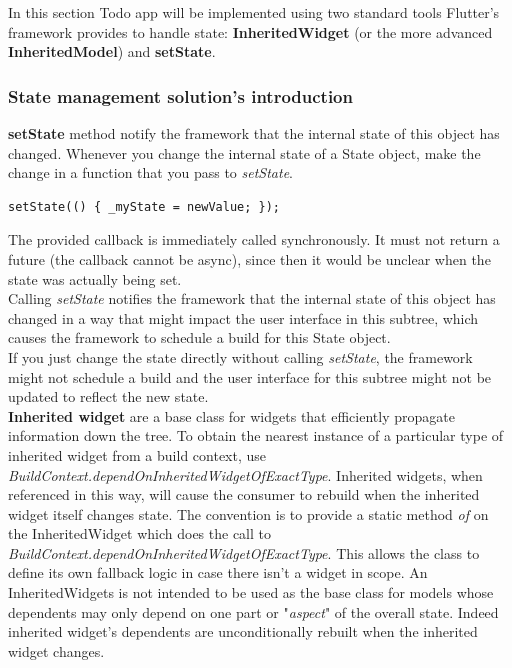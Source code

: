 In this section Todo app will be implemented using two standard tools Flutter’s framework provides to handle state: \textbf{InheritedWidget} (or the more advanced \textbf{InheritedModel}) and \textbf{setState}.
\subsubsection{State management solution’s introduction}  \label{par:todo_app_inherited_widget_introduction}
\textbf{setState} method notify the framework that the internal state of this object has changed.
Whenever you change the internal state of a State object, make the change in a function that you pass to \textit{setState}.\\

\begin{code}
\begin{verbatim}
setState(() { _myState = newValue; });

\end{verbatim}
\end{code}
\mbox{}
The provided callback is immediately called synchronously. It must not return a future (the callback cannot be async), since then it would be unclear when the state was actually being set.\\
Calling \textit{setState} notifies the framework that the internal state of this object has changed in a way that might impact the user interface in this subtree, which causes the framework to schedule a build for this State object.\\
If you just change the state directly without calling \textit{setState}, the framework might not schedule a build and the user interface for this subtree might not be updated to reflect the new state.\\
\textbf{Inherited widget} are a base class for widgets that efficiently propagate information down the tree.
To obtain the nearest instance of a particular type of inherited widget from a build context, use \textit{BuildContext.dependOnInheritedWidgetOfExactType}.
Inherited widgets, when referenced in this way, will cause the consumer to rebuild when the inherited widget itself changes state.
The convention is to provide a static method \textit{of} on the InheritedWidget which does the call to \textit{BuildContext.\textit{dependOnInheritedWidgetOfExactType}}. This allows the class to define its own fallback logic in case there isn't a widget in scope.
An InheritedWidgets is not intended to be used as the base class for models whose dependents may only depend on one part or "\textit{aspect}" of the overall state. Indeed inherited widget's dependents are unconditionally rebuilt when the inherited widget changes. \\


